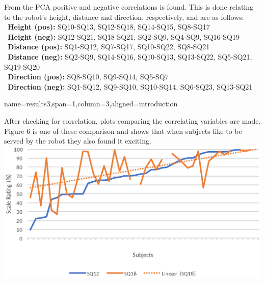 \documentclass[paperwidth=118cm,paperheight=84cm,landscape,fontscale=0.2941]{baposter}
\begin{document}
\begin{poster}
{From the PCA positive and negative correlations is found. This is done relating to the robot's height, distance and direction, respectively, and are as follows:\\
\textbullet~\textbf{Height (pos):}  SQ10-SQ13, SQ12-SQ18, SQ14-SQ15, SQ8-SQ17\\
\textbullet~\textbf{Height (neg):} SQ12-SQ21, SQ18-SQ21, SQ2-SQ9, SQ4-SQ9, SQ16-SQ19\\
\textbullet~\textbf{Distance (pos):} SQ1-SQ12, SQ7-SQ17, SQ10-SQ22, SQ8-SQ21\\
\textbullet~\textbf{Distance (neg):} SQ2-SQ9, SQ14-SQ16, SQ10-SQ13, SQ13-SQ22, SQ5-SQ21, SQ19-SQ20\\
\textbullet~\textbf{Direction (pos):} SQ8-SQ10, SQ9-SQ14, SQ5-SQ7\\
\textbullet~\textbf{Direction (neg):} SQ1-SQ12, SQ9-SQ10, SQ10-SQ14, SQ6-SQ23, SQ13-SQ21

%





	


}


\headerbox{ }
{name=results3,span=1,column=3,aligned=introduction}
{\parskip 5pt
After checking for correlation, plots comparing the correlating variables are made. Figure 6 is one of these comparison and shows that when subjects like to be served by the robot they also found it exciting. 
\includegraphics[width=0.9\linewidth]{SQ12_SQ18.eps}

}
\end{poster}
\end{document}
